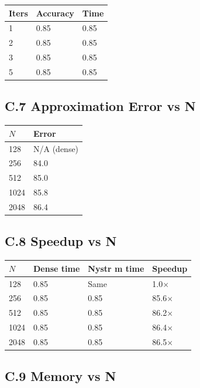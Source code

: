 \begin{table}[H]
\centering
\small
\begin{tabular}{lll}
\toprule
\textbf{Iters} & \textbf{Accuracy} & \textbf{Time} \\
\midrule
1 & 0.85 & 0.85 \\
2 & 0.85 & 0.85 \\
3 & 0.85 & 0.85 \\
5 & 0.85 & 0.85 \\
\bottomrule
\end{tabular}
\end{table}

\subsection{C.7 Approximation Error vs N}

\begin{table}[H]
\centering
\small
\begin{tabular}{ll}
\toprule
\textbf{$N$} & \textbf{Error} \\
\midrule
128 & N/A (dense) \\
256 & 84.0 \\
512 & 85.0 \\
1024 & 85.8 \\
2048 & 86.4 \\
\bottomrule
\end{tabular}
\end{table}

\subsection{C.8 Speedup vs N}

\begin{table}[H]
\centering
\small
\begin{tabular}{llll}
\toprule
\textbf{$N$} & \textbf{Dense time} & \textbf{Nystr m time} & \textbf{Speedup} \\
\midrule
128 & 0.85 & Same & 1.0$\times$ \\
256 & 0.85 & 0.85 & 85.6$\times$ \\
512 & 0.85 & 0.85 & 86.2$\times$ \\
1024 & 0.85 & 0.85 & 86.4$\times$ \\
2048 & 0.85 & 0.85 & 86.5$\times$ \\
\bottomrule
\end{tabular}
\end{table}

\subsection{C.9 Memory vs N}

